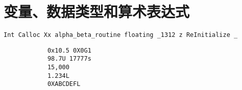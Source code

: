 \chapter{变量、数据类型和算术表达式}
{
    \begin{practice}
        \verb|Int Calloc Xx alpha_beta_routine floating _1312 z ReInitialize _|
    \end{practice}

    \begin{practice}
        \begin{verbatim}
            0x10.5 0X0G1
            98.7U 17777s
            15,000
            1.234L
            0XABCDEFL
        \end{verbatim}
    \end{practice}
}

\cleardoublepage

\endinput
